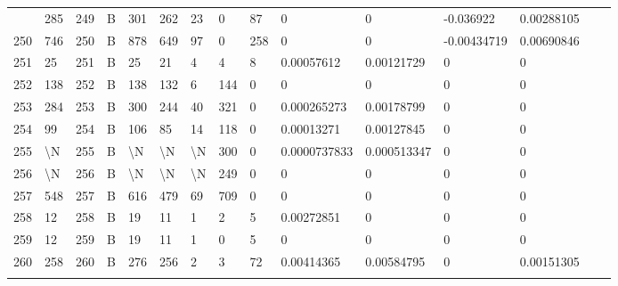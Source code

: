 \begin{longtable}{lllllllllllllll}
\begin{comment}
	249 & 285               & 249 & B   & 301               & 262               & 23                & 0    & 87         & 0              & 0              & -0.036922     & 0.00288105   \\
	250 & 746               & 250 & B   & 878               & 649               & 97                & 0    & 258        & 0              & 0              & -0.00434719   & 0.00690846   \\
	251 & 25                & 251 & B   & 25                & 21                & 4                 & 4    & 8          & 0.00057612     & 0.00121729     & 0             & 0            \\
	252 & 138               & 252 & B   & 138               & 132               & 6                 & 144  & 0          & 0              & 0              & 0             & 0            \\
	253 & 284               & 253 & B   & 300               & 244               & 40                & 321  & 0          & 0.000265273    & 0.00178799     & 0             & 0            \\
	254 & 99                & 254 & B   & 106               & 85                & 14                & 118  & 0          & 0.00013271     & 0.00127845     & 0             & 0            \\
	255 & \textbackslash{}N & 255 & B   & \textbackslash{}N & \textbackslash{}N & \textbackslash{}N & 300  & 0          & 0.0000737833   & 0.000513347    & 0             & 0            \\
	256 & \textbackslash{}N & 256 & B   & \textbackslash{}N & \textbackslash{}N & \textbackslash{}N & 249  & 0          & 0              & 0              & 0             & 0            \\
	257 & 548               & 257 & B   & 616               & 479               & 69                & 709  & 0          & 0              & 0              & 0             & 0            \\
	258 & 12                & 258 & B   & 19                & 11                & 1                 & 2    & 5          & 0.00272851     & 0              & 0             & 0            \\
	259 & 12                & 259 & B   & 19                & 11                & 1                 & 0    & 5          & 0              & 0              & 0             & 0            \\
	260 & 258               & 260 & B   & 276               & 256               & 2                 & 3    & 72         & 0.00414365     & 0.00584795     & 0             & 0.00151305   \\

\end{comment}
\end{longtable}
